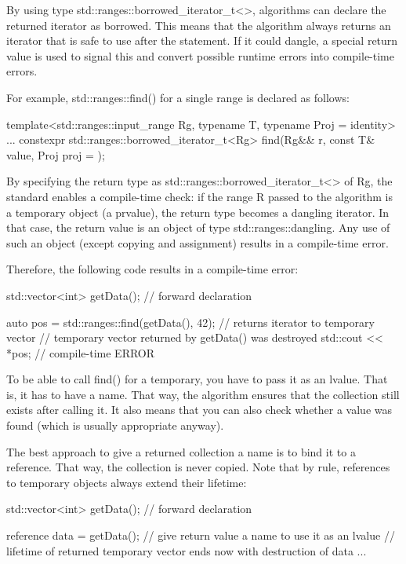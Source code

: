 By using type std::ranges::borrowed\_iterator\_t<>, algorithms can declare the returned iterator as borrowed. This means that the algorithm always returns an iterator that is safe to use after the statement. If it could dangle, a special return value is used to signal this and convert possible runtime errors into compile-time errors.

For example, std::ranges::find() for a single range is declared as follows:

\begin{cpp}
template<std::ranges::input_range Rg,
			typename T,
			typename Proj = identity>
...
constexpr std::ranges::borrowed_iterator_t<Rg>
	find(Rg&& r, const T& value, Proj proj = {});
\end{cpp}

By specifying the return type as std::ranges::borrowed\_iterator\_t<> of Rg, the standard enables a compile-time check: if the range R passed to the algorithm is a temporary object (a prvalue), the return type becomes a dangling iterator. In that case, the return value is an object of type std::ranges::dangling. Any use of such an object (except copying and assignment) results in a compile-time error.

Therefore, the following code results in a compile-time error:

\begin{cpp}
std::vector<int> getData(); // forward declaration

auto pos = std::ranges::find(getData(), 42); // returns iterator to temporary vector
// temporary vector returned by getData() was destroyed
std::cout << *pos; // compile-time ERROR
\end{cpp}

To be able to call find() for a temporary, you have to pass it as an lvalue. That is, it has to have a name. That way, the algorithm ensures that the collection still exists after calling it. It also means that you can also check whether a value was found (which is usually appropriate anyway).

The best approach to give a returned collection a name is to bind it to a reference. That way, the collection is never copied. Note that by rule, references to temporary objects always extend their lifetime:

\begin{cpp}
std::vector<int> getData(); // forward declaration

reference data = getData(); // give return value a name to use it as an lvalue
// lifetime of returned temporary vector ends now with destruction of data
...
\end{cpp}

